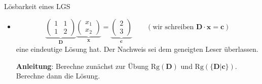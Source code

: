 \begin{example}{Lösbarkeit eines LGS}
\begin{itemize}
      Wohingegen das LGS
    \item
       \[
        \underbrace{\begin{pmatrix}1&1\\1&2\end{pmatrix}}_{\mathbf{D}}
        \underbrace{\begin{pmatrix}x_1\\x_2\end{pmatrix}}_{\mathbf{x}}=
        \underbrace{\begin{pmatrix}2\\3\end{pmatrix}}_{\mathbf{c}}
	\qquad(\text{wir schreiben }\mathbf{D\cdot x}=\mathbf{c})
      \]
      eine eindeutige Lösung hat. Der Nachweis sei dem geneigten Leser überlassen.

      \textbf{Anleitung}: Berechne zunächst zur Übung $\text{Rg}(\mathbf{D})$ und
      $\text{Rg}(\mathbf{\{D|c\}})$. Berechne dann die Lösung.


  \end{itemize}
\end{example}
